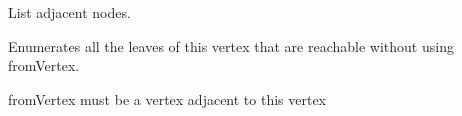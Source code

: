 \documentclass[letterpaper,12pt,english]{sphinxmanual}
\begin{document}
\begin{fulllineitems}
\begin{fulllineitems}
\end{fulllineitems}


\begin{fulllineitems}
\label{\detokenize{api/modules:cbmpy.fluxmodules.decomposition.Leaf.getAdjacent}}
\pysigstartsignatures
\pysiglinewithargsret
{}
{}
{}
\pysigstopsignatures
\sphinxAtStartPar
List adjacent nodes.

\end{fulllineitems}


\begin{fulllineitems}
\label{\detokenize{api/modules:cbmpy.fluxmodules.decomposition.Leaf.getLeaves}}
\pysigstartsignatures
\pysiglinewithargsret
{}
{}
{}
\pysigstopsignatures
\sphinxAtStartPar
Enumerates all the leaves of this vertex that are reachable without using
fromVertex.

\sphinxAtStartPar
fromVertex must be a vertex adjacent to this vertex

\end{fulllineitems}


\end{fulllineitems}

\end{document}
